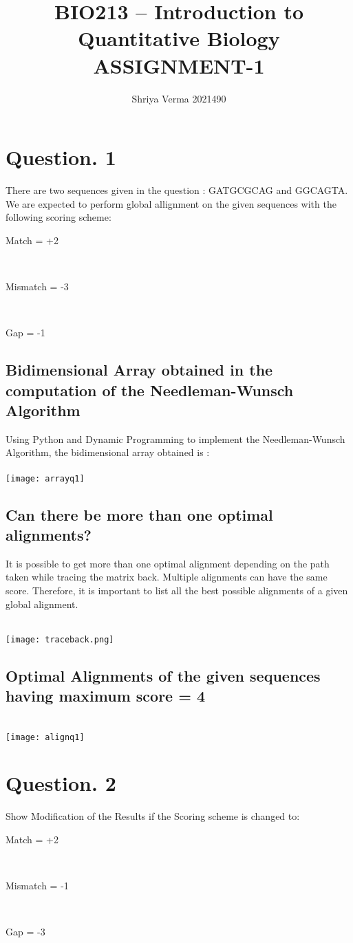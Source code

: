 \documentclass{article}
\title{BIO213 – Introduction to Quantitative Biology 
ASSIGNMENT-1
}
\author{Shriya Verma 2021490 }
\begin{document}
\maketitle

\section{Question. 1}
There are two sequences given in the question : GATGCGCAG and GGCAGTA. We are expected to perform global allignment on the given sequences with the following scoring scheme: 
                            \\ \centerline{Match = +2}
                            \\ \centerline{Mismatch = -3}
                            \\ \centerline{Gap = -1}

\subsection{Bidimensional Array obtained in the computation of the Needleman-Wunsch Algorithm }
Using Python and Dynamic Programming to implement the Needleman-Wunsch Algorithm, the bidimensional array obtained is : 
\\
\\
\centering\texttt{[image: arrayq1]}
\\

\hfill \break
\subsection{Can there be more than one optimal alignments? }
It is possible to get more than one optimal alignment depending on the path taken while tracing the matrix back. Multiple alignments can have the same score. Therefore, it is important to list all the best possible alignments of a given global alignment.
\hfill \break

\\ \centering\texttt{[image: traceback.png]}

\subsection{Optimal Alignments of the given sequences having maximum score = 4  }

\\ \centering\texttt{[image: alignq1]}


\RaggedRight\section{Question. 2}
Show Modification of the Results if the Scoring scheme is changed to:
                            \\ \centerline{Match = +2}
                            \\ \centerline{Mismatch = -1}
                            \\ \centerline{Gap = -3}
\end{document}

